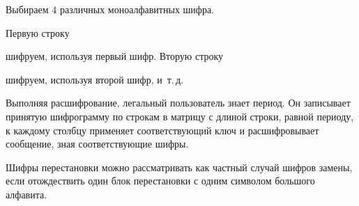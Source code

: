Выбираем $4$ различных моноалфавитных шифра.

Первую строку

\begin{center}  \end{center}

шифруем, используя первый шифр. Вторую строку

\begin{center}  \end{center}

шифруем, используя второй шифр, и~т.\,д.

Выполняя расшифрование, легальный пользователь знает период. Он записывает принятую шифрограмму по строкам в матрицу с длиной строки, равной периоду, к каждому столбцу применяет соответствующий ключ и расшифровывает сообщение, зная соответствующие шифры.

Шифры перестановки можно рассматривать как частный случай шифров замены, если отождествить один блок перестановки с одним символом большого алфавита.
